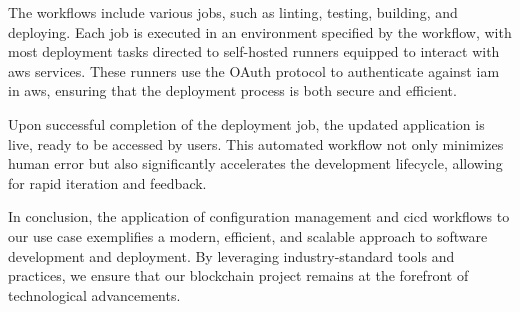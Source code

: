 The workflows include various jobs, such as linting, testing, building, and deploying. Each job is executed in an environment specified by the workflow, with most deployment tasks directed to self-hosted runners equipped to interact with \gls{aws} services. These runners use the OAuth protocol to authenticate against \gls{iam} in \gls{aws}, ensuring that the deployment process is both secure and efficient.

Upon successful completion of the deployment job, the updated application is live, ready to be accessed by users. This automated workflow not only minimizes human error but also significantly accelerates the development lifecycle, allowing for rapid iteration and feedback.

In conclusion, the application of configuration management and \gls{cicd} workflows to our use case exemplifies a modern, efficient, and scalable approach to software development and deployment. By leveraging industry-standard tools and practices, we ensure that our blockchain project remains at the forefront of technological advancements.
